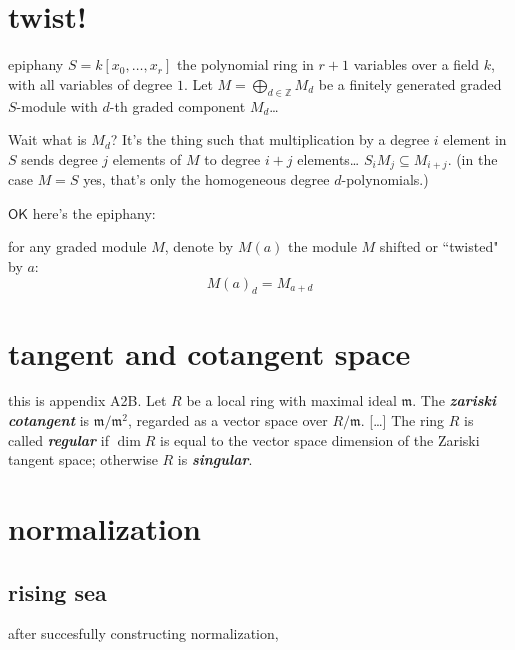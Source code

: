 \section{twist!}

\begin{thing6}{epiphany}\leavevmode
	\(S=k[x_0,\ldots,x_r]\) the polynomial ring in \(r+1\) variables over a field \(k\), with all variables of degree \(1\). Let \(M =\bigoplus_{d \in \mathbb{Z}}M_d\) be a finitely generated graded \(S\)-module with \(d\)-th graded component \(M_d\)…

	Wait what is  \(M_d\)? It's the thing such that multiplication by a degree \(i\) element in \(S\) sends degree \(j\) elements of \(M\) to degree \(i+j\) elements… \(S_i M_j \subseteq M_{i+j}\). (in the case \(M=S\) yes, that's only the homogeneous degree \(d\)-polynomials.)

	\(\mathsf{OK}\) here's the epiphany:
	\begin{tcolorbox}[colback=white,colframe=black,boxrule=0.5pt,sharp corners]
	for any graded module \(M\), denote by \(M(a)\) the module \(M\) shifted or ``twisted" by \(a\):
	\[M(a)_d=M_{a+d}\]
	
	\end{tcolorbox}
\end{thing6}

\section{tangent and cotangent space}

this is \cite{sys} appendix A2B. Let \(R\) be a local ring with maximal ideal \(\mathfrak{m}\). The \textit{\textbf{zariski cotangent}} is \(\mathfrak{m}/\mathfrak{m}^2\), regarded as a vector space over \(R/\mathfrak{m}\). […] The ring \(R\) is called \textit{\textbf{regular}} if \(\dim R\) is equal to the vector space dimension of the Zariski tangent space; otherwise \(R\) is \textit{\textbf{singular}}.

\section{normalization}

\subsection{rising sea}

after succesfully constructing normalization,

